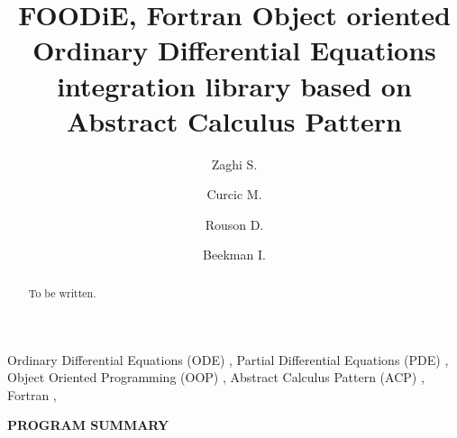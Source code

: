 \documentclass[pdftex,preprint,3p,times,numbers]{elsarticle}
\begin{document}
\begin{frontmatter}

\title{FOODiE, Fortran Object oriented Ordinary Differential Equations integration library based on Abstract Calculus Pattern}

\author[insean]{Zaghi S.}
\address[insean]{CNR-INSEAN, Istituto Nazionale per Studi ed Esperienze di Architettura Navale, Via di Vallerano 139, Rome, Italy, 00128}

\author[rsmas]{Curcic M.}
\address[rsmas]{Ocean Sciences Rosenstiel School of Marine and Atmospheric Science, University of Miami, 4600 Rickenbacker Causeway Miami, FL 33149-1098 +1 305.421.4000}

\author[sourcery]{Rouson D.}
\address[sourcery]{Sourcery Institute 482 Michigan Ave., Berkeley, CA 94707}

\author[sourcery]{Beekman I.}

\begin{abstract}
To be written.
\end{abstract}

\begin{keyword}
  Ordinary Differential Equations (ODE) \sep
  Partial Differential Equations (PDE) \sep
  Object Oriented Programming (OOP) \sep
  Abstract Calculus Pattern (ACP) \sep
  Fortran \sep
\end{keyword}

\end{frontmatter}

{\bf PROGRAM SUMMARY}
\end{document}
